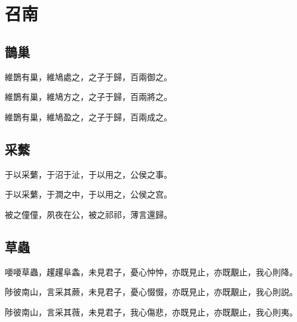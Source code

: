 \section[召南]{召南}

\subsection[鵲巢]{鵲巢}

維鵲有巢，維鳩處之，之子于歸，百兩御之。

維鵲有巢，維鳩方之，之子于歸，百兩將之。

維鵲有巢，維鳩盈之，之子于歸，百兩成之。

\subsection[采蘩]{采蘩}

于以采蘩，于沼于沚，于以用之，公侯之事。

于以采蘩，于澗之中，于以用之，公侯之宫。

被之僮僮，夙夜在公，被之祁祁，薄言還歸。

\subsection[草蟲]{草蟲}

喓喓草蟲，趯趯阜螽，未見君子，憂心忡忡，亦既見止，亦既覯止，我心則降。

陟彼南山，言采其蕨，未見君子，憂心惙惙，亦既見止，亦既覯止，我心則説。

陟彼南山，言采其薇，未見君子，我心傷悲，亦既見止，亦既覯止，我心則夷。
